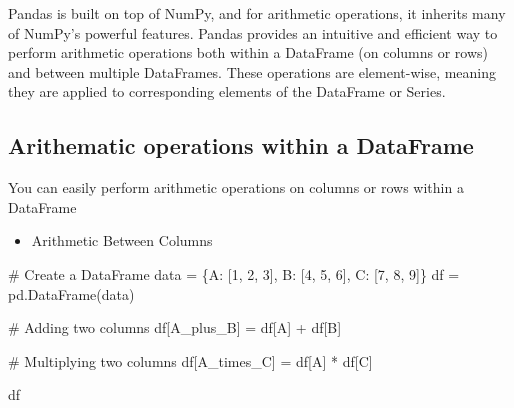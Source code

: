 \documentclass[
  letterpaper,
  DIV=11,
  numbers=noendperiod]{scrreprt}
\newenvironment{Shaded}{\begin{snugshade}}{\end{snugshade}}
\newcommand{\CommentTok}[1]{\textcolor[rgb]{0.37,0.37,0.37}{#1}}
\newcommand{\DecValTok}[1]{\textcolor[rgb]{0.68,0.00,0.00}{#1}}
\newcommand{\NormalTok}[1]{\textcolor[rgb]{0.00,0.23,0.31}{#1}}
\newcommand{\OperatorTok}[1]{\textcolor[rgb]{0.37,0.37,0.37}{#1}}
\newcommand{\StringTok}[1]{\textcolor[rgb]{0.13,0.47,0.30}{#1}}
\providecommand{\tightlist}{%
  \setlength{\itemsep}{0pt}\setlength{\parskip}{0pt}}\usepackage{longtable,booktabs,array}
\begin{document}
Pandas is built on top of NumPy, and for arithmetic operations, it
inherits many of NumPy's powerful features. Pandas provides an intuitive
and efficient way to perform arithmetic operations both within a
DataFrame (on columns or rows) and between multiple DataFrames. These
operations are element-wise, meaning they are applied to corresponding
elements of the DataFrame or Series.

\hypertarget{arithematic-operations-within-a-dataframe}{%
\subsection{Arithematic operations within a
DataFrame}\label{arithematic-operations-within-a-dataframe}}

You can easily perform arithmetic operations on columns or rows within a
DataFrame

\begin{itemize}
\tightlist
\item
  Arithmetic Between Columns
\end{itemize}

\begin{Shaded}
\begin{Highlighting}[]
\CommentTok{\# Create a DataFrame}
\NormalTok{data }\OperatorTok{=}\NormalTok{ \{}\StringTok{\textquotesingle{}A\textquotesingle{}}\NormalTok{: [}\DecValTok{1}\NormalTok{, }\DecValTok{2}\NormalTok{, }\DecValTok{3}\NormalTok{],}
        \StringTok{\textquotesingle{}B\textquotesingle{}}\NormalTok{: [}\DecValTok{4}\NormalTok{, }\DecValTok{5}\NormalTok{, }\DecValTok{6}\NormalTok{],}
        \StringTok{\textquotesingle{}C\textquotesingle{}}\NormalTok{: [}\DecValTok{7}\NormalTok{, }\DecValTok{8}\NormalTok{, }\DecValTok{9}\NormalTok{]\}}
\NormalTok{df }\OperatorTok{=}\NormalTok{ pd.DataFrame(data)}

\CommentTok{\# Adding two columns}
\NormalTok{df[}\StringTok{\textquotesingle{}A\_plus\_B\textquotesingle{}}\NormalTok{] }\OperatorTok{=}\NormalTok{ df[}\StringTok{\textquotesingle{}A\textquotesingle{}}\NormalTok{] }\OperatorTok{+}\NormalTok{ df[}\StringTok{\textquotesingle{}B\textquotesingle{}}\NormalTok{]}

\CommentTok{\# Multiplying two columns}
\NormalTok{df[}\StringTok{\textquotesingle{}A\_times\_C\textquotesingle{}}\NormalTok{] }\OperatorTok{=}\NormalTok{ df[}\StringTok{\textquotesingle{}A\textquotesingle{}}\NormalTok{] }\OperatorTok{*}\NormalTok{ df[}\StringTok{\textquotesingle{}C\textquotesingle{}}\NormalTok{]}

\NormalTok{df}
\end{Highlighting}
\end{Shaded}
\end{document}
